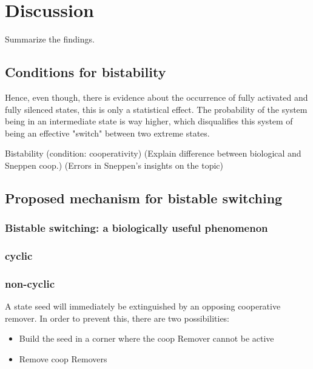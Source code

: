 \chapter{Discussion}
    \label{cha:discussion}
    \begin{itemize}
        {
            \color{red}
            \item Summarize the findings.
        }
    \end{itemize}

    \section{Conditions for bistability}
        Hence, even though, there is evidence about the occurrence of fully activated and fully silenced states, this is only a statistical effect. The probability of the system being in an intermediate state is way higher, which disqualifies this system of being an effective "switch" between two extreme states.

        \begin{itemize}
            {
                \color{red}
                \item Bistability (condition: cooperativity) (Explain difference between biological and Sneppen coop.) (Errors in Sneppen's insights on the topic)
            }
        \end{itemize}
    \section{Proposed mechanism for bistable switching}
        \subsection{Bistable switching: a biologically useful phenomenon}

        \subsection{cyclic}

        \subsection{non-cyclic}
            \begin{itemize}
                {
                    \color{red}
                    \item A state seed will immediately be extinguished by an opposing cooperative remover. In order to prevent this, there are two possibilities:
                        \begin{itemize}
                            \item Build the seed in a corner where the coop Remover cannot be active
                            \item Remove coop Removers
                        \end{itemize}
                }
            \end{itemize}
%
%
